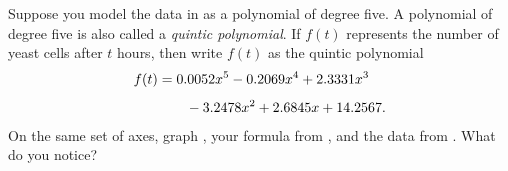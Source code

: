 \documentclass[a4paper,oneside,12pt]{article}
\begin{document}
\begin{problem}
\begin{packedenum}
  \item\label{subprob:yeast_quintic_polynomial}
    Suppose you model the data in  as a polynomial of
    degree five.  A polynomial of degree five is also called a
    \emph{quintic polynomial}.  If $f(t)$ represents the number of
    yeast cells after $t$ hours, then write $f(t)$ as the quintic
    polynomial
    \begin{equation}
    \label{eqn:yeast_quintic_polynomial}
    \begin{aligned}
    f(t)
    &=
    0.0052x^5 - 0.2069x^4 + 2.3331x^3 \\[4pt]
    &\qquad-
    3.2478x^2 + 2.6845x + 14.2567.
    \end{aligned}
    \end{equation}
    On the same set of axes, graph
    , your formula
    from , and the data
    from .  What do you notice?


\end{packedenum}
\end{problem}
\end{document}
